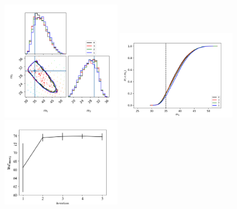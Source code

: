 \documentclass[twocolumn,prd,nofootinbib]{revtex4}
\begin{document}
\begin{figure}
%
\includegraphics[width=0.45\textwidth]{figures/bbh_zerospin_m1_m2.png}
\includegraphics[width=0.45\textwidth]{figures/bbh_zerospin_m1_cum.png}
\includegraphics[width=0.45\textwidth]{figures/bbh_zerospin_lnL_meanVar.png}

\end{figure}
\end{document}
